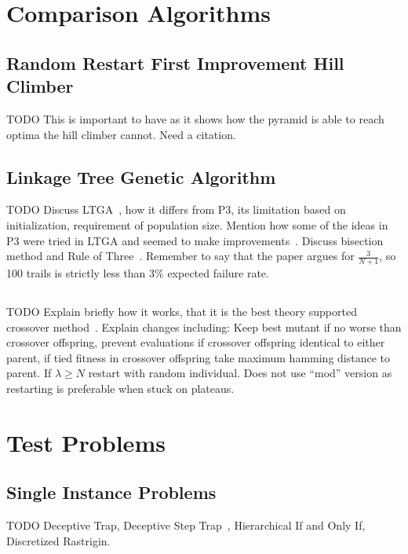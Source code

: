 \documentclass{sig-alternate}
\begin{document}
\section{Comparison Algorithms}

\subsection{Random Restart First Improvement Hill Climber}
TODO This is important to have as it shows how the pyramid is able to reach optima
the hill climber cannot.  Need a citation.

\subsection{Linkage Tree Genetic Algorithm}
TODO Discuss LTGA~\cite{thierens:2013:ltgahiff}, how it differs from P3, its limitation based on
initialization, requirement of population size.  Mention how some
of the ideas in P3 were tried in LTGA and seemed to make improvements~\cite{goldman:2012:ltga}.
Discuss bisection method and Rule of Three~\cite{jovanovic:1997:ruleofthree}.
Remember to say that the paper argues for $\frac{3}{N+1}$, so 100 trails is strictly
less than $3\%$ expected failure rate.

\subsection{}
TODO Explain briefly how it works, that it is the best theory supported crossover method~\cite{doerr:2013:lambdalambda}.
Explain changes including: Keep best mutant if no worse than crossover offspring,
prevent evaluations if crossover offspring identical to either parent, if tied fitness
in crossover offspring take maximum hamming distance to parent.  If $\lambda \ge N$
restart with random individual.  Does not use ``mod'' version as restarting is preferable
when stuck on plateaus.

\section{Test Problems}

\subsection{Single Instance Problems}
TODO Deceptive Trap, Deceptive Step Trap~\cite{goldman:2012:ltga}, Hierarchical If
and Only If, Discretized Rastrigin.
\end{document}
